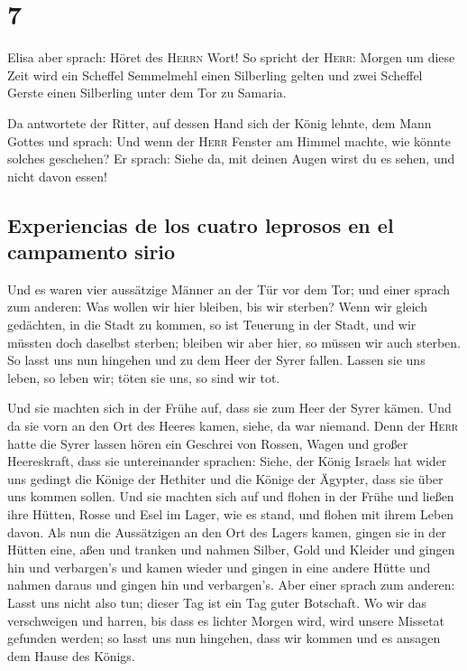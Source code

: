 \hypertarget{section-6}{%
\section{7}\label{section-6}}

 Elisa aber sprach: Höret des \textsc{Herrn} Wort! So
spricht der \textsc{Herr}: Morgen um diese Zeit wird ein Scheffel
Semmelmehl einen Silberling gelten und zwei Scheffel Gerste einen
Silberling unter dem Tor zu Samaria.

 Da antwortete der Ritter, auf dessen Hand sich der König
lehnte, dem Mann Gottes und sprach: Und wenn der \textsc{Herr} Fenster
am Himmel machte, wie könnte solches geschehen? Er sprach: Siehe da, mit
deinen Augen wirst du es sehen, und nicht davon essen!

\hypertarget{experiencias-de-los-cuatro-leprosos-en-el-campamento-sirio}{%
\subsection{Experiencias de los cuatro leprosos en el campamento
sirio}\label{experiencias-de-los-cuatro-leprosos-en-el-campamento-sirio}}

 Und es waren vier aussätzige Männer an der Tür vor dem
Tor; und einer sprach zum anderen: Was wollen wir hier bleiben, bis wir
sterben?  Wenn wir gleich gedächten, in die Stadt zu
kommen, so ist Teuerung in der Stadt, und wir müssten doch daselbst
sterben; bleiben wir aber hier, so müssen wir auch sterben. So lasst uns
nun hingehen und zu dem Heer der Syrer fallen. Lassen sie uns leben, so
leben wir; töten sie uns, so sind wir tot.

 Und sie machten sich in der Frühe auf, dass sie zum Heer
der Syrer kämen. Und da sie vorn an den Ort des Heeres kamen, siehe, da
war niemand.  Denn der \textsc{Herr} hatte die Syrer
lassen hören ein Geschrei von Rossen, Wagen und großer Heereskraft, dass
sie untereinander sprachen: Siehe, der König Israels hat wider uns
gedingt die Könige der Hethiter und die Könige der Ägypter, dass sie
über uns kommen sollen.  Und sie machten sich auf und
flohen in der Frühe und ließen ihre Hütten, Rosse und Esel im Lager, wie
es stand, und flohen mit ihrem Leben davon.  Als nun die
Aussätzigen an den Ort des Lagers kamen, gingen sie in der Hütten eine,
aßen und tranken und nahmen Silber, Gold und Kleider und gingen hin und
verbargen's und kamen wieder und gingen in eine andere Hütte und nahmen
daraus und gingen hin und verbargen's.  Aber einer sprach
zum anderen: Lasst uns nicht also tun; dieser Tag ist ein Tag guter
Botschaft. Wo wir das verschweigen und harren, bis dass es lichter
Morgen wird, wird unsere Missetat gefunden werden; so lasst uns nun
hingehen, dass wir kommen und es ansagen dem Hause des Königs.

